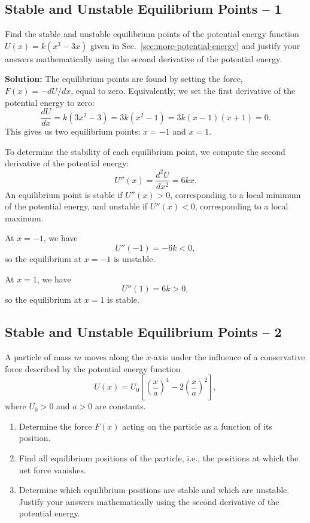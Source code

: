 \documentclass[12pt]{article}
\begin{document}
\subsection{Stable and Unstable Equilibrium Points -- 1}
Find the stable and unstable equilibrium points of the potential energy function $U(x) = k(x^3-3x)$ given in Sec.~\ref{sec:more-potential-energy} and justify your answers mathematically using the second derivative of the potential energy.

\textbf{Solution:} The equilibrium points are found by setting the force, $F(x)=-dU/dx$, equal to zero. Equivalently, we set the first derivative of the potential energy to zero:
\begin{equation}
    \frac{dU}{dx} = k(3x^2-3)
    = 3k(x^2-1)
    = 3k(x-1)(x+1) = 0.
\end{equation}
This gives us two equilibrium points: $x=-1$ and $x=1$.

To determine the stability of each equilibrium point, we compute the second derivative of the potential energy:
\begin{equation}
    U''(x) = \frac{d^2U}{dx^2} = 6kx.
\end{equation}
An equilibrium point is stable if $U''(x)>0$, corresponding to a local minimum of the potential energy, and unstable if $U''(x)<0$, corresponding to a local maximum.

At $x=-1$, we have
\begin{equation}
    U''(-1)=-6k<0,
\end{equation}
so the equilibrium at $x=-1$ is unstable.

At $x=1$, we have
\begin{equation}
    U''(1)=6k>0,
\end{equation}
so the equilibrium at $x=1$ is stable.

\subsection{Stable and Unstable Equilibrium Points -- 2}

A particle of mass $m$ moves along the $x$-axis under the influence of a conservative force described by the potential energy function
\begin{equation}
    U(x) = U_0 \left[\left(\frac{x}{a}\right)^4 - 2\left(\frac{x}{a}\right)^2\right],
\end{equation}
where $U_0>0$ and $a>0$ are constants.

\begin{enumerate}
    \item[(a)] Determine the force $F(x)$ acting on the particle as a function of its position.

    \item[(b)] Find all equilibrium positions of the particle, i.e., the positions at which the net force vanishes.

    \item[(c)] Determine which equilibrium positions are stable and which are unstable. Justify your answers mathematically using the second derivative of the potential energy.
\end{enumerate}
\end{document}
